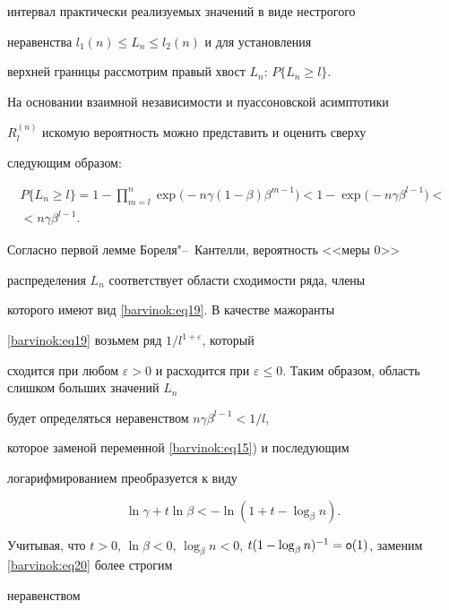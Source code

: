 интервал практически реализуемых значений в виде нестрогого

неравенства $l_1 (n)\le L_n \le l_2 (n)$ и для установления

верхней границы рассмотрим правый хвост $L_n$: $P \{L_n \ge l\}$.

На основании взаимной независимости и пуассоновской асимптотики

$R_l^{(n)}$ искомую вероятность можно представить и оценить сверху

следующим образом:

\begin{multline}

\label{barvinok:eq19} P\{L_n \ge l\}=1-\prod\limits_{m=l}^n \exp

\bigl(-n\gamma (1-\beta)\beta ^{m-1}\bigr)<1-\exp \bigl(-n\gamma \beta ^{l-1}\bigr)< \\ <n\gamma \beta^{l-1}.

\end{multline}

Согласно первой лемме Бореля"--~Кантелли, вероятность <<меры 0>>

распределения $L_n $ соответствует области сходимости ряда, члены

которого имеют вид \eqref{barvinok:eq19}. В качестве мажоранты

\eqref{barvinok:eq19} возьмем ряд $1/l^{1+\varepsilon}$, который

сходится при любом $\varepsilon >0$ и расходится при $\varepsilon

\le 0$. Таким образом, область слишком больших значений $L_n$

будет определяться неравенством $n\gamma \beta ^{l-1}<1/l$,

которое заменой переменной \eqref{barvinok:eq15}) и последующим

логарифмированием преобразуется к виду

\begin{equation}

\label{barvinok:eq20} \ln \gamma +t\ln \beta <-\ln (1+t-\log

_\beta n).

\end{equation}

Учитывая, что $t>0$, $\ln \beta <0$, $\log _\beta n<0$, $t(1-\log

_\beta n)^{-1}={\sf o}(1)$, заменим \eqref{barvinok:eq20} более строгим

неравенством 

